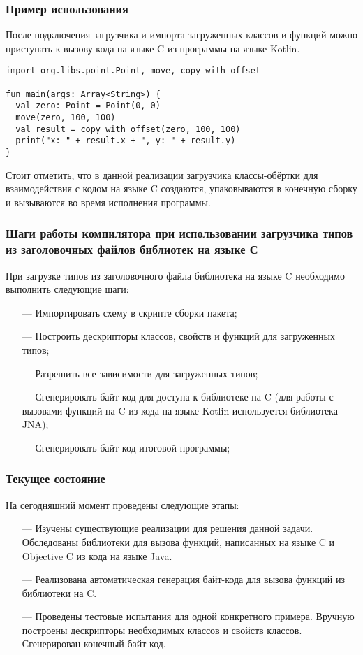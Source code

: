 \documentclass{article}
\begin{document}
\subsubsection{Пример использования}
После подключения загрузчика и импорта загруженных классов и функций можно приступать к вызову кода на языке C из программы на языке Kotlin.
\begin{lstlisting}
import org.libs.point.Point, move, copy_with_offset

fun main(args: Array<String>) {
  val zero: Point = Point(0, 0)
  move(zero, 100, 100)
  val result = copy_with_offset(zero, 100, 100)
  print("x: " + result.x + ", y: " + result.y)
}
\end{lstlisting}
Стоит отметить, что в данной реализации загрузчика классы-обёртки для взаимодействия с кодом на языке C создаются, упаковываются в конечную сборку и вызываются во время исполнения программы.

\subsubsection{Шаги работы компилятора при использовании загрузчика типов из заголовочных файлов библиотек на языке С}
При загрузке типов из заголовочного файла библиотека на языке C необходимо выполнить следующие шаги:
\begin{itemize}
\item[---] Импортировать схему в скрипте сборки пакета;
\item[---] Построить дескрипторы классов, свойств и функций для загруженных типов;
\item[---] Разрешить все зависимости для загруженных типов;
\item[---] Сгенерировать байт-код для доступа к библиотеке на C (для работы с вызовами функций на C из кода на языке Kotlin используется библиотека JNA);
\item[---] Сгенерировать байт-код итоговой программы;
\end{itemize}

\subsubsection{Текущее состояние}
На сегодняшний момент проведены следующие этапы:
\begin{itemize}
\item[---] Изучены существующие реализации для решения данной задачи. Обследованы библиотеки для вызова функций, написанных на языке C и Objective C из кода на языке Java.
\item[---] Реализована автоматическая генерация байт-кода для вызова функций из библиотеки на C.
\item[---] Проведены тестовые испытания для одной конкретного примера. Вручную построены дескрипторы необходимых классов и свойств классов. Сгенерирован конечный байт-код.
\end{itemize}
\end{document}

